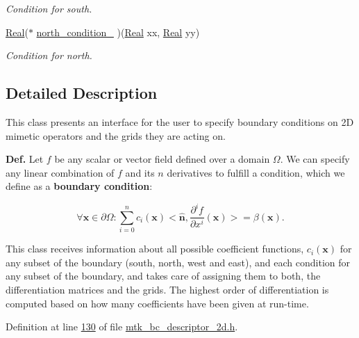 \begin{DoxyCompactItemize}
\begin{DoxyCompactList}\small\item\em Condition for south. \end{DoxyCompactList}\item 
\hyperlink{group__c01-roots_gac080bbbf5cbb5502c9f00405f894857d}{Real}($\ast$ \hyperlink{classmtk_1_1BCDescriptor2D_a23e0b9ae755dcf81841aa24ddaf0b090}{north\+\_\+condition\+\_\+} )(\hyperlink{group__c01-roots_gac080bbbf5cbb5502c9f00405f894857d}{Real} xx, \hyperlink{group__c01-roots_gac080bbbf5cbb5502c9f00405f894857d}{Real} yy)
\begin{DoxyCompactList}\small\item\em Condition for north. \end{DoxyCompactList}\end{DoxyCompactItemize}


\subsection{Detailed Description}
This class presents an interface for the user to specify boundary conditions on 2\+D mimetic operators and the grids they are acting on.

{\bfseries Def.} Let $ f $ be any scalar or vector field defined over a domain $ \Omega $. We can specify any linear combination of $ f $ and its $ n $ derivatives to fulfill a condition, which we define as a {\bfseries boundary condition}\+:

\[ \forall \mathbf{x} \in \partial\Omega: \sum_{i = 0}^{n} c_i(\mathbf{x}) <\hat{\mathbf{n}}, \frac{\partial^i f}{\partial x^i}(\mathbf{x})> = \beta(\mathbf{x}). \]

This class receives information about all possible coefficient functions, $ c_i(\mathbf{x}) $ for any subset of the boundary (south, north, west and east), and each condition for any subset of the boundary, and takes care of assigning them to both, the differentiation matrices and the grids. The highest order of differentiation is computed based on how many coefficients have been given at run-\/time. 

Definition at line \hyperlink{mtk__bc__descriptor__2d_8h_source_l00130}{130} of file \hyperlink{mtk__bc__descriptor__2d_8h_source}{mtk\+\_\+bc\+\_\+descriptor\+\_\+2d.\+h}.



